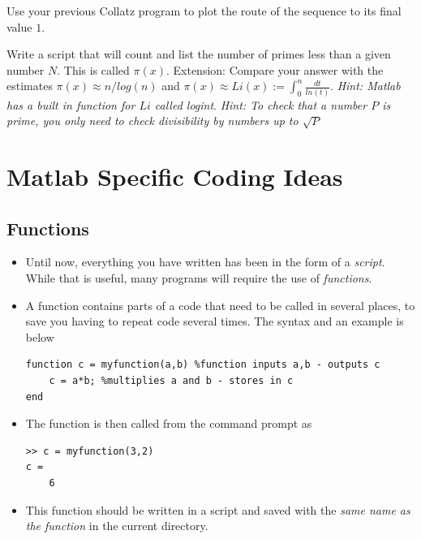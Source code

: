 \documentclass[12pt]{report}
\begin{document}
\begin{tcolorbox}[title=Task]
  Use your previous Collatz program to plot the route of the sequence to its final value $1$.
\end{tcolorbox}

\begin{tcolorbox}[title=Task - Difficult]
  Write a script that will count and list the number of primes less than a given number $N$. This is called $\pi(x)$.
  \tcblower
  Extension: Compare your answer with the estimates $\pi(x) \approx n/log(n)$ and $\pi(x) \approx Li(x) := \int_0^n \frac{dt}{ln(t)}$. \textit{Hint: Matlab has a built in function for $Li$ called logint}. \textit{Hint: To check that a number $P$ is prime, you only need to check divisibility by numbers up to $\sqrt{P}$}
\end{tcolorbox}

\clearpage

\section*{Matlab Specific Coding Ideas}

\subsection*{Functions}

\begin{itemize}
\item Until now, everything you have written has been in the form of a \textit{script}. While that is useful, many programs will require the use of \textit{functions}.
\item A function contains parts of a code that need to be called in several places, to save you having to repeat code several times. The syntax and an example is below
\begin{lstlisting}
function c = myfunction(a,b) %function inputs a,b - outputs c
	c = a*b; %multiplies a and b - stores in c
end
\end{lstlisting}
\item The function is then called from the command prompt as
\begin{lstlisting}
>> c = myfunction(3,2)
c = 
	6
\end{lstlisting}
\item This function should be written in a script and saved with the \textit{same name as the function} in the current directory.
\end{itemize}
\end{document}
